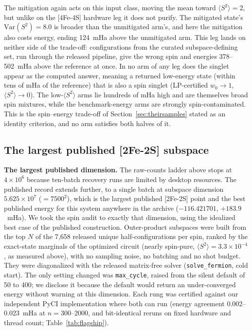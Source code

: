 \documentclass[11pt]{article}
\newcommand{\ssq}{\ensuremath{\langle S^2\rangle}}
\begin{document}
The mitigation again acts on this input class, moving the mean toward $\ssq = 2$, but unlike on the [4Fe-4S] hardware leg it does not purify. The mitigated state's $\mathrm{Var}(S^2) = 8.0$ is broader than the unmitigated arm's, and here the mitigation also costs energy, ending 124~mHa above the unmitigated arm. This leg lands on neither side of the trade-off: configurations from the curated subspace-defining set, run through the released pipeline, give the wrong spin and energies 378--502~mHa above the reference at once. In no arm of any leg does the singlet appear as the computed answer, meaning a returned low-energy state (within tens of mHa of the reference) that is also a spin singlet (LP-certified $w_0 \to 1$, $\ssq \to 0$). The low-$\ssq$ arms lie hundreds of mHa high and are themselves broad spin mixtures, while the benchmark-energy arms are strongly spin-contaminated. This is the spin--energy trade-off of Section~\ref{sec:theirsamples} stated as an identity criterion, and no arm satisfies both halves of it.

\subsection{The largest published [2Fe-2S] subspace}\label{sec:flagship}

\textbf{The largest published dimension.} The raw-counts ladder above stops at $4\times10^6$ because ten-batch recovery runs are limited by desktop resources. The published record extends further, to a single batch at subspace dimension $5.625\times10^7$ ($= 7500^2$), which is the largest published [2Fe-2S] point and the best published energy for this system anywhere in the archive ($-116.421701$, $+183.9$~mHa). We took the spin audit to exactly that dimension, using the idealized best case of the published construction. Outer-product subspaces were built from the top $N$ of the 7{,}658 released unique half-configurations per spin, ranked by the exact-state marginals of the optimized circuit (nearly spin-pure, $\ssq = 3.3\times10^{-4}$, as measured above), with no sampling noise, no batching and no shot budget. They were diagonalized with the released matrix-free solver (\texttt{solve\_fermion}, cold start). The only setting changed was \texttt{max\_cycle}, raised from the silent default of 50 to 400; we disclose it because the default would return an under-converged energy without warning at this dimension. Each rung was certified against our independent PyCI implementation where both can run (energy agreement 0.002--0.023~mHa at $n = 300$--2000, and bit-identical reruns on fixed hardware and thread count; Table~\ref{tab:flagship}).
\end{document}
